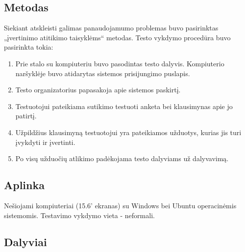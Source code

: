 	\subsection{Metodas}
	
		Siekiant atskleisti galimas panaudojamumo problemas buvo pasirinktas „įvertinimo atitikimo taisyklėms“ metodas.
		Testo vykdymo procedūra buvo pasirinkta tokia:
		\begin{enumerate}
			\item Prie stalo su kompiuteriu buvo pasodintas testo dalyvis. Kompiuterio naršyklėje buvo atidarytas sistemos prisijungimo puslapis.
			\item Testo organizatorius papasakoja apie sistemos paskirtį.
			\item Testuotojui pateikiama sutikimo testuoti anketa bei klausimynas apie jo patirtį.
			\item Užpildžius klausimyną testuotojui yra pateikiamos užduotys, kurias jis turi įvykdyti ir įvertinti.
			\item Po visų užduočių atlikimo padėkojama testo dalyviams už dalyvavimą.
		\end{enumerate}
	
	\subsection{Aplinka}
	
		Nešiojami kompiuteriai (15.6' ekranas) su Windows bei Ubuntu operacinėmis sistemomis.
		Testavimo vykdymo vieta - neformali.
	
	\subsection{Dalyviai}
	
